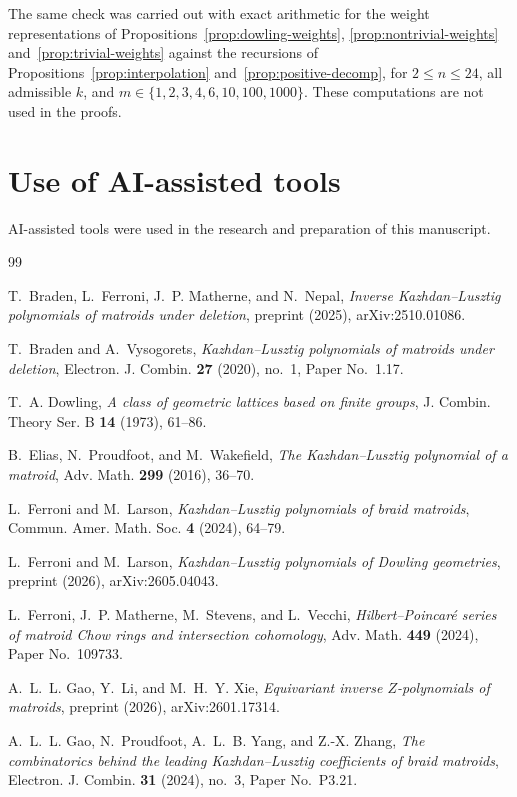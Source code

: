 \documentclass[11pt]{amsart}
\theoremstyle{definition}
\theoremstyle{remark}
\numberwithin{equation}{section}
\begin{document}
The same check was carried out with exact arithmetic for the weight representations of Propositions~\ref{prop:dowling-weights}, \ref{prop:nontrivial-weights} and~\ref{prop:trivial-weights} against the recursions of Propositions~\ref{prop:interpolation} and~\ref{prop:positive-decomp}, for $2\le n\le24$, all admissible $k$, and $m\in\{1,2,3,4,6,10,100,1000\}$. These computations are not used in the proofs.

\section*{Use of AI-assisted tools}
AI-assisted tools were used in the research and preparation of this manuscript.

\begin{thebibliography}{99}

T.~Braden, L.~Ferroni, J.~P. Matherne, and N.~Nepal, \emph{Inverse Kazhdan--Lusztig polynomials of matroids under deletion}, preprint (2025), arXiv:2510.01086.

T.~Braden and A.~Vysogorets, \emph{Kazhdan--Lusztig polynomials of matroids under deletion}, Electron. J. Combin. \textbf{27} (2020), no.~1, Paper No.~1.17.

T.~A. Dowling, \emph{A class of geometric lattices based on finite groups}, J. Combin. Theory Ser. B \textbf{14} (1973), 61--86.

B.~Elias, N.~Proudfoot, and M.~Wakefield, \emph{The Kazhdan--Lusztig polynomial of a matroid}, Adv. Math. \textbf{299} (2016), 36--70.

L.~Ferroni and M.~Larson, \emph{Kazhdan--Lusztig polynomials of braid matroids}, Commun. Amer. Math. Soc. \textbf{4} (2024), 64--79.

L.~Ferroni and M.~Larson, \emph{Kazhdan--Lusztig polynomials of Dowling geometries}, preprint (2026), arXiv:2605.04043.

L.~Ferroni, J.~P. Matherne, M.~Stevens, and L.~Vecchi, \emph{Hilbert--Poincar\'e series of matroid Chow rings and intersection cohomology}, Adv. Math. \textbf{449} (2024), Paper No.~109733.

A.~L.~L. Gao, Y.~Li, and M.~H.~Y. Xie, \emph{Equivariant inverse $Z$-polynomials of matroids}, preprint (2026), arXiv:2601.17314.

A.~L.~L. Gao, N.~Proudfoot, A.~L.~B. Yang, and Z.-X. Zhang, \emph{The combinatorics behind the leading Kazhdan--Lusztig coefficients of braid matroids}, Electron. J. Combin. \textbf{31} (2024), no.~3, Paper No.~P3.21.


\end{thebibliography}
\end{document}
